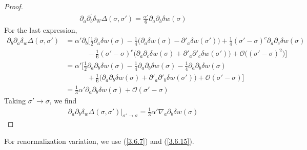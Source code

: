 \begin{tcolorbox}[breakable]
\begin{proof}
		\begin{align}
			\partial_a \partial^{'}_b \delta_W \Delta (\sigma, \sigma')=  \frac{\alpha'}{6}\partial_a \partial_b\delta w(\sigma)
		\end{align}
		For the last expression,
		\begin{align}
			\partial_b \partial_a \delta_w \Delta(\sigma,\sigma') 
			&= \alpha' \partial_b \Bigg[
			\frac{1}{2} \partial_a \delta w(\sigma)
			- \frac{1}{4} \big( \partial_a \delta w(\sigma) - \partial'_a \delta w(\sigma') \big)
			+ \frac{1}{4} (\sigma' - \sigma)^c \partial_a \partial_c \delta w(\sigma) \nonumber \\
			&\qquad\quad
			- \frac{1}{6} (\sigma' - \sigma)^c \big( \partial_a \partial_c \delta w(\sigma)
			+ \partial'_a \partial'_c \delta w(\sigma') \big)
			+ \mathcal{O}\big((\sigma' - \sigma)^2\big)
			\Bigg] \nonumber \\
			&= \alpha' \Bigg[
			\frac{1}{2} \partial_a \partial_b \delta w(\sigma)
			- \frac{1}{4} \partial_a \partial_b \delta w(\sigma)
			- \frac{1}{4} \partial_a \partial_b \delta w(\sigma) \nonumber \\
			&\qquad\quad
			+ \frac{1}{6} \big( \partial_a \partial_b \delta w(\sigma)
			+ \partial'_a \partial'_b \delta w(\sigma') \big)
			+ \mathcal{O}(\sigma' - \sigma)
			\Bigg] \nonumber \\
			&= \frac{1}{3} \alpha' \partial_a \partial_b \delta w(\sigma)
			+ \mathcal{O}(\sigma' - \sigma)
		\end{align}
		Taking $\sigma' \to \sigma$, we find
		\begin{align}
			\partial_a \partial_b \delta_w \Delta(\sigma,\sigma')\Big|_{\sigma' \to \sigma}
			= \frac{1}{3} \alpha' \nabla_a \partial_b \delta w(\sigma)
			\tag{3.165}
		\end{align}
	\end{proof}
\end{tcolorbox}


For renormalization variation, we use (\ref{3.6.7}) and (\ref{3.6.15}).

